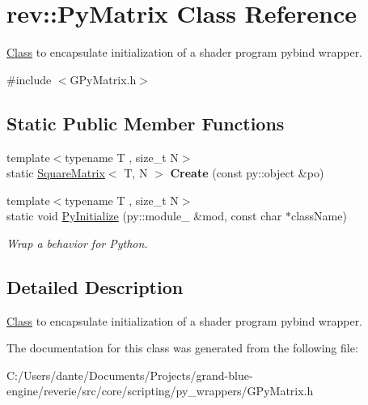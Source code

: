 \hypertarget{classrev_1_1_py_matrix}{}\section{rev\+::Py\+Matrix Class Reference}
\label{classrev_1_1_py_matrix}


\mbox{\hyperlink{struct_class}{Class}} to encapsulate initialization of a shader program pybind wrapper.  




{\ttfamily \#include $<$G\+Py\+Matrix.\+h$>$}

\subsection*{Static Public Member Functions}
\begin{DoxyCompactItemize}
\item 
\mbox{\label{classrev_1_1_py_matrix_a0f072c2662689aa7593e54b72a7024d0}} 
{\footnotesize template$<$typename T , size\+\_\+t N$>$ }\\static \mbox{\hyperlink{classrev_1_1_square_matrix}{Square\+Matrix}}$<$ T, N $>$ {\bfseries Create} (const py\+::object \&po)
\item 
\mbox{\label{classrev_1_1_py_matrix_a886fd996f4e3770bb11e56d66b86954c}} 
{\footnotesize template$<$typename T , size\+\_\+t N$>$ }\\static void \mbox{\hyperlink{classrev_1_1_py_matrix_a886fd996f4e3770bb11e56d66b86954c}{Py\+Initialize}} (py\+::module\+\_\+ \&mod, const char $\ast$class\+Name)
\begin{DoxyCompactList}\small\item\em Wrap a behavior for Python. \end{DoxyCompactList}\end{DoxyCompactItemize}


\subsection{Detailed Description}
\mbox{\hyperlink{struct_class}{Class}} to encapsulate initialization of a shader program pybind wrapper. 

The documentation for this class was generated from the following file\+:\begin{DoxyCompactItemize}
\item 
C\+:/\+Users/dante/\+Documents/\+Projects/grand-\/blue-\/engine/reverie/src/core/scripting/py\+\_\+wrappers/G\+Py\+Matrix.\+h\end{DoxyCompactItemize}
